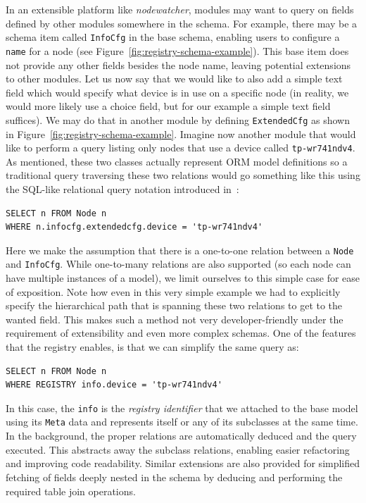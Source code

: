 \documentclass[5p,sort&compress]{elsarticle}
\newcommand{\nodewatcher}{\textit{nodewatcher}}
\begin{document}
In an extensible platform like \nodewatcher{}, modules may want to query on fields defined by other modules somewhere in the schema.
For example, there may be a schema item called \texttt{InfoCfg} in the base schema, enabling users to configure a \texttt{name} for a node (see Figure~\ref{fig:registry-schema-example}).
This base item does not provide any other fields besides the node name, leaving potential extensions to other modules.
Let us now say that we would like to also add a simple text field which would specify what device is in use on a specific node (in reality, we would more likely use a choice field, but for our example a simple text field suffices).
We may do that in another module by defining \texttt{ExtendedCfg} as shown in Figure~\ref{fig:registry-schema-example}.
Imagine now another module that would like to perform a query listing only nodes that use a device called \texttt{tp-wr741ndv4}.
As mentioned, these two classes actually represent ORM model definitions so a traditional query traversing these two relations would go something like this using the SQL-like relational query notation introduced in~\cite{ONeil_2008}:
\begin{verbatim}
SELECT n FROM Node n
WHERE n.infocfg.extendedcfg.device = 'tp-wr741ndv4'
\end{verbatim}

Here we make the assumption that there is a one-to-one relation between a \texttt{Node} and \texttt{InfoCfg}.
While one-to-many relations are also supported (so each node can have multiple instances of a model), we limit ourselves to this simple case for ease of exposition.
Note how even in this very simple example we had to explicitly specify the hierarchical path that is spanning these two relations to get to the wanted field.
This makes such a method not very developer-friendly under the requirement of extensibility and even more complex schemas.
One of the features that the registry enables, is that we can simplify the same query as:
\begin{verbatim}
SELECT n FROM Node n
WHERE REGISTRY info.device = 'tp-wr741ndv4'
\end{verbatim}

In this case, the \texttt{info} is the \textit{registry identifier} that we attached to the base model using its \texttt{Meta} data and represents itself or any of its subclasses at the same time.
In the background, the proper relations are automatically deduced and the query executed.
This abstracts away the subclass relations, enabling easier refactoring and improving code readability.
Similar extensions are also provided for simplified fetching of fields deeply nested in the schema by deducing and performing the required table join operations.
\end{document}
